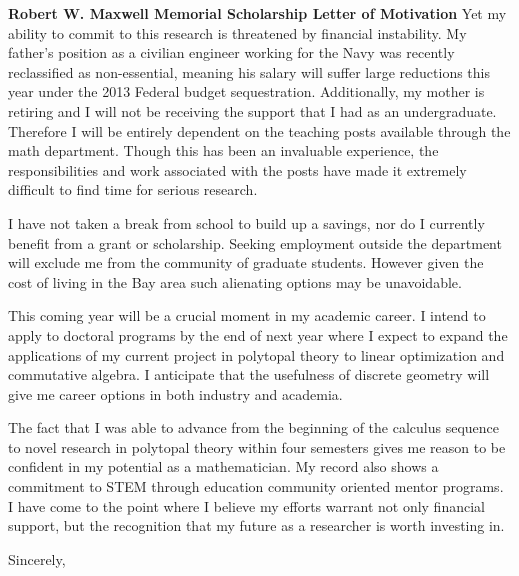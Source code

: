 \documentclass[11pt]{letter} %
\begin{document}
\begin{letter}{\bf Robert W. Maxwell Memorial Scholarship Letter of Motivation}
Yet my ability to commit to this research is threatened by financial instability. My father's position as a civilian engineer working for the Navy was recently reclassified as non-essential, meaning his salary will suffer large reductions this year under the 2013 Federal budget sequestration. Additionally, my mother is retiring and I will not be receiving the support that I had as an undergraduate. Therefore I will be entirely dependent on the teaching posts available through the math department. Though this has been an invaluable experience, the responsibilities and work associated with the posts have made it extremely difficult to find time for serious research. 

    I have not taken a break from school to build up a savings, nor do I currently benefit from a grant or scholarship. 
Seeking employment outside the department will exclude me from the community of graduate students. However given the cost of living in the Bay area such alienating options may be unavoidable.

This coming year will be a crucial moment in my academic career.   I intend to apply to doctoral programs by the end of next year where I expect to expand the applications of my current project in polytopal theory to linear optimization and commutative algebra.  I anticipate that the usefulness of discrete geometry will give me career options in both industry and academia. 

The fact that I was able to advance from the beginning of the calculus sequence to novel research in polytopal theory within four semesters gives me reason to be confident in my potential as a mathematician.  My record also shows a commitment to STEM through education community oriented mentor programs. I have come to the point where I believe my efforts warrant not only financial support, but the recognition that my future as a researcher is worth investing in. 







    \closing{Sincerely,}
   
 
 

\end{letter}
 
 
 \newpage
\end{document}
